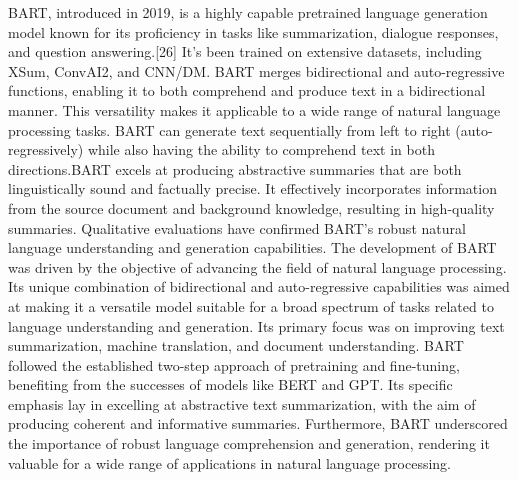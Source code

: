 \documentclass[conference]{IEEEtran}
\begin{document}
BART, introduced in 2019, is a highly capable pretrained language generation model known for its proficiency in tasks like summarization, dialogue responses, and question answering.[26] It's been trained on extensive datasets, including XSum, ConvAI2, and CNN/DM. BART merges bidirectional and auto-regressive functions, enabling it to both comprehend and produce text in a bidirectional manner. This versatility makes it applicable to a wide range of natural language processing tasks. BART can generate text sequentially from left to right (auto-regressively) while also having the ability to comprehend text in both directions.BART excels at producing abstractive summaries that are both linguistically sound and factually precise. It effectively incorporates information from the source document and background knowledge, resulting in high-quality summaries. Qualitative evaluations have confirmed BART's robust natural language understanding and generation capabilities.
The development of BART was driven by the objective of advancing the field of natural language processing. Its unique combination of bidirectional and auto-regressive capabilities was aimed at making it a versatile model suitable for a broad spectrum of tasks related to language understanding and generation. Its primary focus was on improving text summarization, machine translation, and document understanding. BART followed the established two-step approach of pretraining and fine-tuning, benefiting from the successes of models like BERT and GPT. Its specific emphasis lay in excelling at abstractive text summarization, with the aim of producing coherent and informative summaries. Furthermore, BART underscored the importance of robust language comprehension and generation, rendering it valuable for a wide range of applications in natural language processing.
\end{document}

